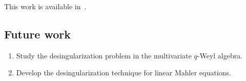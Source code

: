 \documentclass[10pt,a4paper]{article}
\begin{document}

This work is available in~\cite{KZ2018}.

\subsection{Future work}

\begin{enumerate}
 \item Study the desingularization problem in the multivariate $q$-Weyl algebra.
 \item Develop the desingularization technique for linear Mahler equations. 
\end{enumerate}


% 
\end{document}
